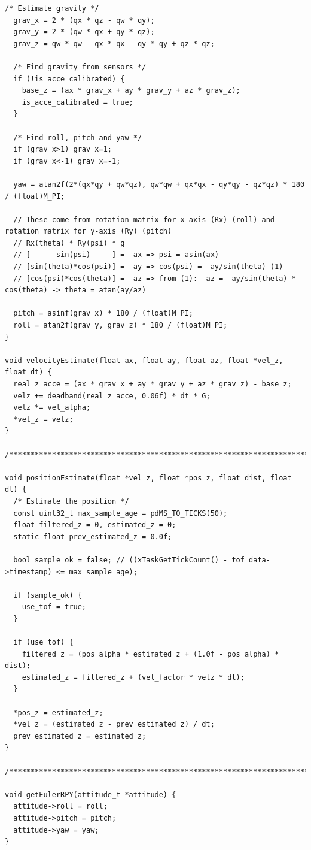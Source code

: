 \begin{lstlisting}[caption={estimator.c}]
  /* Estimate gravity */
  grav_x = 2 * (qx * qz - qw * qy);
  grav_y = 2 * (qw * qx + qy * qz);
  grav_z = qw * qw - qx * qx - qy * qy + qz * qz;

  /* Find gravity from sensors */
  if (!is_acce_calibrated) {
    base_z = (ax * grav_x + ay * grav_y + az * grav_z);
    is_acce_calibrated = true;
  }

  /* Find roll, pitch and yaw */
  if (grav_x>1) grav_x=1;
  if (grav_x<-1) grav_x=-1;

  yaw = atan2f(2*(qx*qy + qw*qz), qw*qw + qx*qx - qy*qy - qz*qz) * 180 / (float)M_PI;

  // These come from rotation matrix for x-axis (Rx) (roll) and rotation matrix for y-axis (Ry) (pitch)
  // Rx(theta) * Ry(psi) * g
  // [     -sin(psi)     ] = -ax => psi = asin(ax)
  // [sin(theta)*cos(psi)] = -ay => cos(psi) = -ay/sin(theta) (1)
  // [cos(psi)*cos(theta)] = -az => from (1): -az = -ay/sin(theta) * cos(theta) -> theta = atan(ay/az)

  pitch = asinf(grav_x) * 180 / (float)M_PI;
  roll = atan2f(grav_y, grav_z) * 180 / (float)M_PI;
}

void velocityEstimate(float ax, float ay, float az, float *vel_z, float dt) {
  real_z_acce = (ax * grav_x + ay * grav_y + az * grav_z) - base_z;
  velz += deadband(real_z_acce, 0.06f) * dt * G;
  velz *= vel_alpha;
  *vel_z = velz;
}

/**********************************************************************/

void positionEstimate(float *vel_z, float *pos_z, float dist, float dt) {
  /* Estimate the position */
  const uint32_t max_sample_age = pdMS_TO_TICKS(50);
  float filtered_z = 0, estimated_z = 0;
  static float prev_estimated_z = 0.0f;

  bool sample_ok = false; // ((xTaskGetTickCount() - tof_data->timestamp) <= max_sample_age);

  if (sample_ok) {
    use_tof = true;
  }

  if (use_tof) {
    filtered_z = (pos_alpha * estimated_z + (1.0f - pos_alpha) * dist);
    estimated_z = filtered_z + (vel_factor * velz * dt);
  } 

  *pos_z = estimated_z;
  *vel_z = (estimated_z - prev_estimated_z) / dt;
  prev_estimated_z = estimated_z;
}

/**********************************************************************/

void getEulerRPY(attitude_t *attitude) {
  attitude->roll = roll; 
  attitude->pitch = pitch;
  attitude->yaw = yaw;
}


\end{lstlisting}
